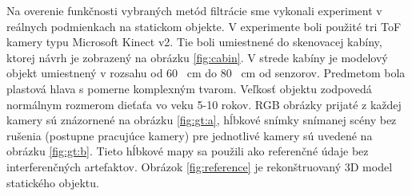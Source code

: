 Na overenie funkčnosti vybraných metód filtrácie sme vykonali experiment v reálnych podmienkach na statickom objekte. V experimente boli použité tri ToF kamery typu Microsoft Kinect v2. Tie boli umiestnené do skenovacej kabíny, ktorej návrh je zobrazený na obrázku \ref{fig:cabin}. V strede kabíny je modelový objekt umiestnený v rozsahu od 60 \ cm do 80 \ cm od senzorov. Predmetom bola plastová hlava s pomerne komplexným tvarom. Veľkosť objektu zodpovedá normálnym rozmerom dieťaťa vo veku 5-10 rokov.
RGB obrázky prijaté z každej kamery sú znázornené na obrázku \ref {fig:gt:a}, hĺbkové snímky snímanej scény bez rušenia (postupne pracujúce kamery) pre jednotlivé kamery sú uvedené na obrázku \ref {fig:gt:b}. Tieto hĺbkové mapy sa použili ako referenčné údaje bez interferenčných artefaktov. Obrázok \ref{fig:reference} je rekonštruovaný 3D model statického objektu.

